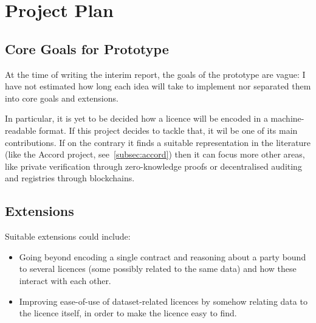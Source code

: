 
\chapter{Project Plan}\label{ch:timeline}


\section{Core Goals for Prototype}\label{sec:core-goals}

At the time of writing the interim report, the goals of the prototype are vague: I have not estimated
how long each idea will take to implement nor separated them into core goals and extensions.

In particular, it is yet to be decided how a licence will be encoded in a machine-readable format.
If this project decides to tackle that, it wil be one of its main contributions.
If on the contrary it finds a suitable representation in the literature (like the Accord
project, see~\ref{subsec:accord}) then it can focus more other areas, like private verification through
zero-knowledge proofs or decentralised auditing and registries through blockchains.


\section{Extensions}\label{sec:extensions}

Suitable extensions could include:
\begin{itemize}
    \item Going beyond encoding a single contract and reasoning about a party bound to several
    licences (some possibly related to the same data) and how these interact with each other.
    \item Improving ease-of-use of dataset-related licences by somehow relating data to the licence
    itself, in order to make the licence easy to find.
\end{itemize}
\newcommand{\foo}{\color{darkgray}\makebox[0pt]{\small\textbullet}\hskip-0.5pt\vrule width 1pt\hspace{\labelsep}}
\newcommand{\bfoo}{\raisebox{2.1ex}[0pt]{\makebox[\dimexpr2\tabcolsep]
{\color{LightSteelBlue3}\tiny\textbullet}}}
\newcommand{\tfoo}{\makebox[\dimexpr2\tabcolsep]{}}%
\daymonth

\newcommand{\para}{\newline\newline}

